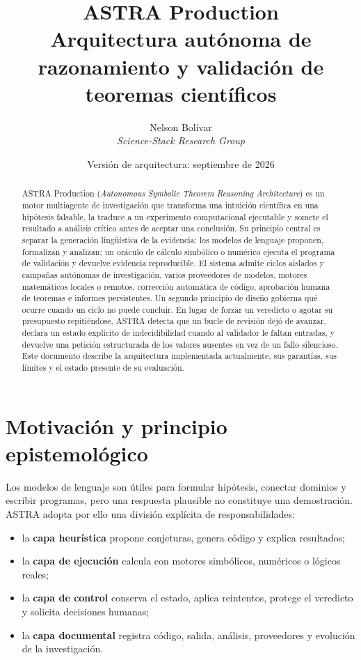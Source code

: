 \documentclass[11pt,a4paper]{article}
\title{\textbf{ASTRA Production}\\[2mm]
\large Arquitectura autónoma de razonamiento y validación de teoremas científicos}
\author{Nelson Bolívar\\\textit{Science-Stack Research Group}}
\date{Versión de arquitectura: septiembre de 2026}
\begin{document}
\maketitle

\begin{abstract}
ASTRA Production (\textit{Autonomous Symbolic Theorem Reasoning Architecture}) es un motor multiagente de investigación que transforma una intuición científica en una hipótesis falsable, la traduce a un experimento computacional ejecutable y somete el resultado a análisis crítico antes de aceptar una conclusión. Su principio central es separar la generación lingüística de la evidencia: los modelos de lenguaje proponen, formalizan y analizan; un oráculo de cálculo simbólico o numérico ejecuta el programa de validación y devuelve evidencia reproducible. El sistema admite ciclos aislados y campañas autónomas de investigación, varios proveedores de modelos, motores matemáticos locales o remotos, corrección automática de código, aprobación humana de teoremas e informes persistentes. Un segundo principio de diseño gobierna qué ocurre cuando un ciclo no puede concluir. En lugar de forzar un veredicto o agotar su presupuesto repitiéndose, ASTRA detecta que un bucle de revisión dejó de avanzar, declara un estado explícito de indecidibilidad cuando al validador le faltan entradas, y devuelve una petición estructurada de los valores ausentes en vez de un fallo silencioso. Este documento describe la arquitectura implementada actualmente, sus garantías, sus límites y el estado presente de su evaluación.
\end{abstract}

\section{Motivación y principio epistemológico}

Los modelos de lenguaje son útiles para formular hipótesis, conectar dominios y escribir programas, pero una respuesta plausible no constituye una demostración. ASTRA adopta por ello una división explícita de responsabilidades:

\begin{itemize}
  \item la \textbf{capa heurística} propone conjeturas, genera código y explica resultados;
  \item la \textbf{capa de ejecución} calcula con motores simbólicos, numéricos o lógicos reales;
  \item la \textbf{capa de control} conserva el estado, aplica reintentos, protege el veredicto y solicita decisiones humanas;
  \item la \textbf{capa documental} registra código, salida, análisis, proveedores y evolución de la investigación.
\end{itemize}
\end{document}
